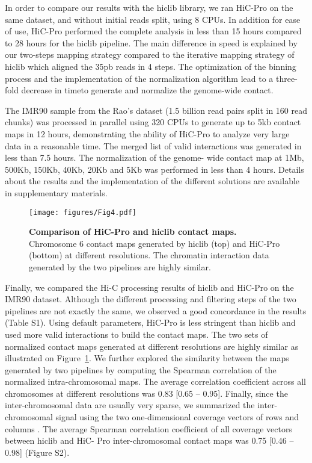 In order to compare our results with the hiclib library, we ran HiC-Pro on the
same dataset, and without initial reads split, using 8 CPUs. In addition for
ease of use, HiC-Pro performed the complete analysis in less than 15 hours
compared to 28 hours for the hiclib pipeline. The main difference in speed is
explained by our two-steps mapping strategy compared to the iterative mapping
strategy of hiclib which aligned the 35pb reads in 4 steps. The optimization
of the binning process and the implementation of the normalization algorithm
lead to a three-fold decrease in timeto generate and normalize the genome-wide
contact.

The IMR90 sample from the Rao's dataset (1.5 billion read pairs split in 160
read chunks) was processed in parallel using 320 CPUs to generate up to 5kb
contact maps in 12 hours, demonstrating the ability of HiC-Pro to analyze very
large data in a reasonable time. The merged list of valid interactions was
generated in less than 7.5 hours. The normalization of the genome- wide
contact map at 1Mb, 500Kb, 150Kb, 40Kb, 20Kb and 5Kb was performed in less
than 4 hours. Details about the results and the implementation of the
different solutions are available in supplementary materials.

\begin{figure}
\texttt{[image: figures/Fig4.pdf]}
\caption{\textbf{Comparison of HiC-Pro and hiclib contact maps.} Chromosome 6
contact maps generated by hiclib (top) and HiC-Pro (bottom) at different
resolutions. The chromatin interaction data generated by the two pipelines are
highly similar.}
\label{fig:fig4}
\end{figure}


Finally, we compared the Hi-C processing results of hiclib and HiC-Pro on the
IMR90 dataset. Although the different processing and filtering steps of the
two pipelines are not exactly the same, we observed a good concordance in the
results (Table S1). Using default parameters, HiC-Pro is less stringent than
hiclib and used more valid interactions to build the contact maps. The two
sets of normalized contact maps generated at different resolutions are highly
similar as illustrated on Figure~\ref{fig:fig4}. We further explored the
similarity between the maps generated by two pipelines by computing the
Spearman correlation of the normalized intra-chromosomal maps. The average
correlation coefficient across all chromosomes at different resolutions was
0.83 [0.65 – 0.95]. Finally, since the inter-chromosomal data are usually very
sparse, we summarized the inter- chromosomal signal using the two
one-dimensional coverage vectors of rows and columns
\citep{yaffe:probabilistic, hu:hicnorm}. The average Spearman correlation
coefficient of all coverage vectors between hiclib and HiC- Pro
inter-chromosomal contact maps was 0.75 [0.46 – 0.98] (Figure S2).

